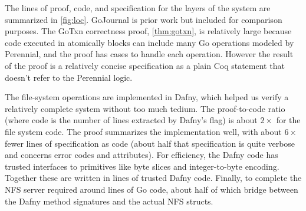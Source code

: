 The lines of proof, code, and specification for the layers of the system are
summarized in \autoref{fig:loc}. GoJournal is prior work but included for
comparison purposes. The GoTxn correctness proof, \autoref{thm:gotxn}, is
relatively large because code executed in atomically blocks can include many Go
operations modeled by Perennial, and the proof has cases to handle
each operation. However the result of the proof is a relatively concise
specification as a plain Coq statement that doesn't refer to the Perennial
logic.




The file-system operations are implemented in Dafny, which helped us verify a
relatively complete system without too much tedium. The
proof-to-code ratio (where code is the number of lines extracted by Dafny's
 flag) is about $2\times$ for the file system code.
The proof summarizes the implementation well, with about $6\times$ fewer lines
of specification as code (about half that specification is quite verbose and concerns
error codes and attributes). For efficiency, the Dafny code has trusted interfaces to
primitives like byte slices and integer-to-byte encoding. Together these are
written in  lines of trusted Dafny code.
Finally, to complete the NFS server required around  lines of Go
code, about half of which bridge between the Dafny method signatures and the
actual NFS structs.


\begin{comment}
begin
    rm -rf src-compiled
    for file in src/*/**.dfy
        set -l path (string sub --start 4 $file)
        set -l dir (dirname $path)
        mkdir -p src-compiled/$dir
        dafny /printMode:NoGhost /dafnyVerify:0 /rprint:src-compiled/$path $file &
    end
    wait
    cloc --read-lang-def ~/dafny-lang.txt src-compiled
    cloc --read-lang-def ~/dafny-lang.txt src
end
\end{comment}

